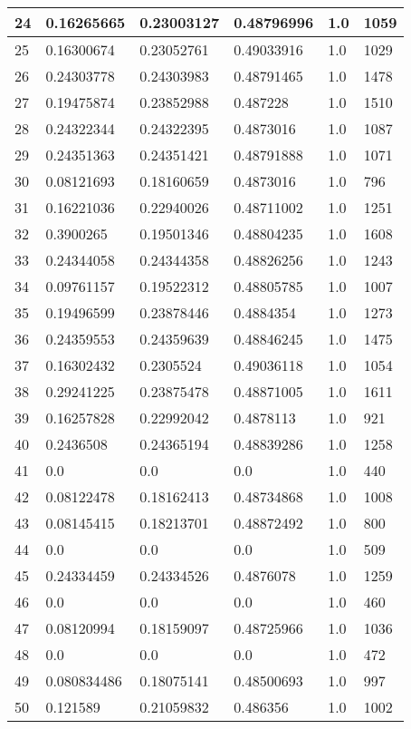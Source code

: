 \begin{longtable}{|l|l|l|l|l|l|}
24 & 0.16265665 & 0.23003127 & 0.48796996 & 1.0 & 1059 \\ \hline 
25 & 0.16300674 & 0.23052761 & 0.49033916 & 1.0 & 1029 \\ \hline 
26 & 0.24303778 & 0.24303983 & 0.48791465 & 1.0 & 1478 \\ \hline 
27 & 0.19475874 & 0.23852988 & 0.487228 & 1.0 & 1510 \\ \hline 
28 & 0.24322344 & 0.24322395 & 0.4873016 & 1.0 & 1087 \\ \hline 
29 & 0.24351363 & 0.24351421 & 0.48791888 & 1.0 & 1071 \\ \hline 
30 & 0.08121693 & 0.18160659 & 0.4873016 & 1.0 & 796 \\ \hline 
31 & 0.16221036 & 0.22940026 & 0.48711002 & 1.0 & 1251 \\ \hline 
32 & 0.3900265 & 0.19501346 & 0.48804235 & 1.0 & 1608 \\ \hline 
33 & 0.24344058 & 0.24344358 & 0.48826256 & 1.0 & 1243 \\ \hline 
34 & 0.09761157 & 0.19522312 & 0.48805785 & 1.0 & 1007 \\ \hline 
35 & 0.19496599 & 0.23878446 & 0.4884354 & 1.0 & 1273 \\ \hline 
36 & 0.24359553 & 0.24359639 & 0.48846245 & 1.0 & 1475 \\ \hline 
37 & 0.16302432 & 0.2305524 & 0.49036118 & 1.0 & 1054 \\ \hline 
38 & 0.29241225 & 0.23875478 & 0.48871005 & 1.0 & 1611 \\ \hline 
39 & 0.16257828 & 0.22992042 & 0.4878113 & 1.0 & 921 \\ \hline 
40 & 0.2436508 & 0.24365194 & 0.48839286 & 1.0 & 1258 \\ \hline 
41 & 0.0 & 0.0 & 0.0 & 1.0 & 440 \\ \hline 
42 & 0.08122478 & 0.18162413 & 0.48734868 & 1.0 & 1008 \\ \hline 
43 & 0.08145415 & 0.18213701 & 0.48872492 & 1.0 & 800 \\ \hline 
44 & 0.0 & 0.0 & 0.0 & 1.0 & 509 \\ \hline 
45 & 0.24334459 & 0.24334526 & 0.4876078 & 1.0 & 1259 \\ \hline 
46 & 0.0 & 0.0 & 0.0 & 1.0 & 460 \\ \hline 
47 & 0.08120994 & 0.18159097 & 0.48725966 & 1.0 & 1036 \\ \hline 
48 & 0.0 & 0.0 & 0.0 & 1.0 & 472 \\ \hline 
49 & 0.080834486 & 0.18075141 & 0.48500693 & 1.0 & 997 \\ \hline 
50 & 0.121589 & 0.21059832 & 0.486356 & 1.0 & 1002 \\ \hline 
\end{longtable}